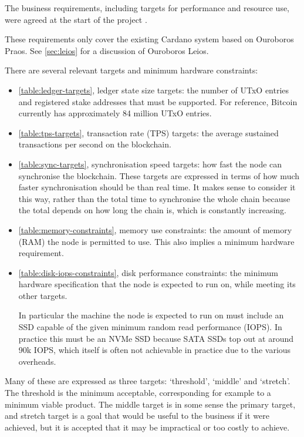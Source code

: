 \documentclass[11pt,a4paper]{article}
\begin{document}
The business requirements, including targets for performance and resource use,
were agreed at the start of the project \citep[Section 3]{utxo-db}.

These requirements only cover the existing Cardano system based on Ouroboros
Praos. See \cref{sec:leios} for a discussion of Ouroboros Leios.

There are several relevant targets and minimum hardware constraints:
\begin{itemize}
\item \cref{table:ledger-targets}, ledger state size targets: the number of
      UTxO entries and registered stake addresses that must be supported. For
      reference, Bitcoin currently has approximately 84 million UTxO entries.
\item \cref{table:tps-targets}, transaction rate (TPS) targets: the average
      sustained transactions per second on the blockchain.
\item \cref{table:sync-targets}, synchronisation speed targets: how fast the
      node can synchronise the blockchain. These targets are expressed in terms
      of how much faster synchronisation should be than real time. It makes
      sense to consider it this way, rather than the total time to synchronise
      the whole chain because the total depends on how long the chain is, which
      is constantly increasing.
\item \cref{table:memory-constraints}, memory use constraints: the amount of
      memory (RAM) the node is permitted to use. This also implies a minimum
      hardware requirement.
\item \cref{table:disk-iops-constraints}, disk performance constraints: the
      minimum hardware specification that the node is expected to run on, while
      meeting its other targets.

      In particular the machine the node is expected to run on must include an
      SSD capable of the given minimum random read performance (IOPS). In
      practice this must be an NVMe SSD because SATA SSDs top out at around 90k
      IOPS, which itself is often not achievable in practice due to the various
      overheads.
\end{itemize}
Many of these are expressed as three targets: `threshold', `middle' and
`stretch'. The threshold is the minimum acceptable, corresponding for example
to a minimum viable product. The middle target is in some sense the primary
target, and stretch target is a goal that would be useful to the business if it
were achieved, but it is accepted that it may be impractical or too costly to
achieve.
\end{document}

